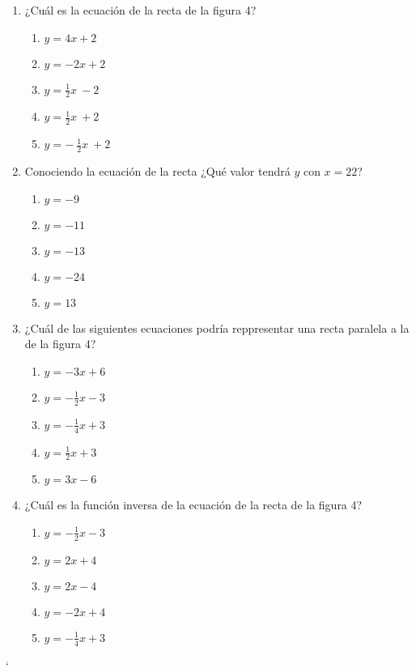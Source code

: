 \documentclass[12pt]{article}
\begin{document}
\begin{enumerate}
\item  ¿Cuál es la ecuación de la recta de la figura 4? \\
\begin{enumerate}
    \item $ y= 4x + 2 $
    \item $ y=- 2 x + 2 $  
    \item $ y= \frac{1}{2} x \ -2 $
    \item $ y= \frac{1}{2} x \ +2$  
    \item $ y= -\ \frac{1}{2} x \ + 2 $
    \end{enumerate}
    
\item  Conociendo la ecuación de la recta ¿Qué valor tendrá $y$ con $x = 22$?  \\
\begin{enumerate}
    \item $ y= -9 $
    \item $ y= -11 $  
    \item $ y= -13 $
    \item $ y= -24 $  
    \item $ y= 13 $
    \end{enumerate}
    
\item  ¿Cuál de las siguientes ecuaciones podría reppresentar una recta paralela a la de la figura 4?  \\
\begin{enumerate}
    \item $ y= -3x +6 $
    \item $ y= - \frac{1}{2}x -3 $  
    \item $ y= - \frac{1}{4}x +3 $
    \item $ y= \frac{1}{2}x +3 $  
    \item $ y= 3x - 6 $
    \end{enumerate}
    
\item  ¿Cuál es la función inversa de la ecuación de la recta de la figura 4?  \\
\begin{enumerate}
    \item $ y= - \frac{1}{2}x -3 $
    \item $ y= 2x +4 $  
    \item $ y= 2x -4  $
    \item $ y= -2x + 4 $  
    \item $ y=- \frac{1}{4}x +3 $
    \end{enumerate}
    
 \end{enumerate} 
`
\end{document}
